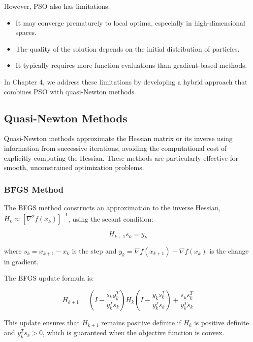 However, PSO also has limitations:

\begin{itemize}
\item It may converge prematurely to local optima, especially in high-dimensional spaces.
\item The quality of the solution depends on the initial distribution of particles.
\item It typically requires more function evaluations than gradient-based methods.
\end{itemize}

In Chapter 4, we address these limitations by developing a hybrid approach that combines PSO with quasi-Newton methods.

\subsection{Quasi-Newton Methods}

Quasi-Newton methods approximate the Hessian matrix or its inverse using information from successive iterations, avoiding the computational cost of explicitly computing the Hessian. These methods are particularly effective for smooth, unconstrained optimization problems.

\subsubsection{BFGS Method}

The BFGS method constructs an approximation to the inverse Hessian, $H_k \approx [\nabla^2 f(x_k)]^{-1}$, using the secant condition:

\begin{equation}
H_{k+1} s_k = y_k
\end{equation}

where $s_k = x_{k+1} - x_k$ is the step and $y_k = \nabla f(x_{k+1}) - \nabla f(x_k)$ is the change in gradient.

The BFGS update formula is:

\begin{equation}
H_{k+1} = \left(I - \frac{s_k y_k^T}{y_k^T s_k}\right) H_k \left(I - \frac{y_k s_k^T}{y_k^T s_k}\right) + \frac{s_k s_k^T}{y_k^T s_k}
\end{equation}

This update ensures that $H_{k+1}$ remains positive definite if $H_k$ is positive definite and $y_k^T s_k > 0$, which is guaranteed when the objective function is convex.

